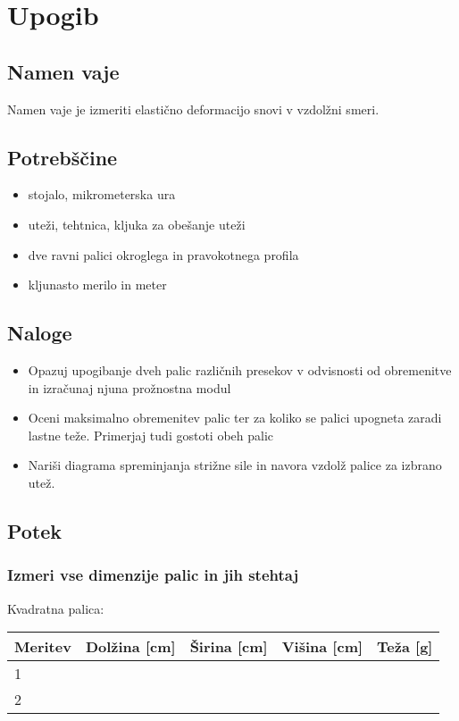\documentclass[11pt, a4paper]{article}
\begin{document}
\section{Upogib}
\subsection{Namen vaje}
Namen vaje je izmeriti elastično deformacijo snovi v vzdolžni smeri. 
\subsection{Potrebščine}
\begin{itemize}

    \item stojalo, mikrometerska ura
    \item uteži, tehtnica, kljuka za obešanje uteži
    \item dve ravni palici okroglega in pravokotnega profila
    \item kljunasto merilo in meter

\end{itemize}
\subsection{Naloge}
\begin{itemize}

    \item Opazuj upogibanje dveh palic različnih presekov v odvisnosti od obremenitve in
izračunaj njuna prožnostna modul
\item Oceni maksimalno obremenitev palic ter za koliko se palici upogneta zaradi lastne
teže. Primerjaj tudi gostoti obeh palic
\item Nariši diagrama spreminjanja strižne sile in navora vzdolž palice za izbrano utež.

\end{itemize}
\subsection{Potek}
\subsubsection{Izmeri vse dimenzije palic in jih stehtaj}
Kvadratna palica:
\begin{center}
\begin{tabular}{|l|l|l|l|l|}
\hline
Meritev & Dolžina {[}cm{]} & Širina {[}cm{]} & Višina {[}cm{]} & Teža {[}g{]} \\ \hline
1       &                  &                 &                 &              \\ \hline
2       &                  &                 &                 &              \\ \hline
\end{tabular}
\end{center}
\end{document}
